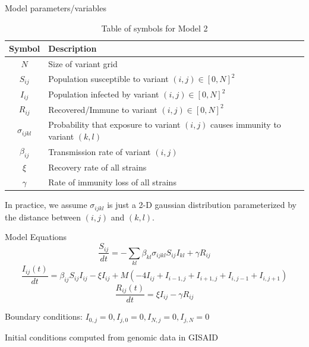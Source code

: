 \documentclass{beamer}
\begin{document}
\begin{frame}{Model parameters/variables}
    \begin{table}[h!]
        \begin{center}
        \begin{tabular}{c|p{8cm}}
                Symbol & Description \\
                \hline
                \hline
                $N$ & Size of variant grid \\
                $S_{ij}$ & Population susceptible to variant $(i,j) \in [0,N]^2$ \\
                $I_{ij}$ & Population infected by variant $(i,j) \in [0,N]^2$\\
                $R_{ij}$ & Recovered/Immune to variant $(i,j) \in [0,N]^2$\\
                $\sigma_{ijkl}$ & Probability that exposure to variant $(i,j)$ causes immunity \newline to variant $(k,l)$\\
                $\beta_{ij}$ & Transmission rate of variant $(i,j)$\\
                $\xi$ & Recovery rate of all strains \\
                $\gamma$ & Rate of immunity loss of all strains \\
        \end{tabular}
        \caption{Table of symbols for Model 2}
    
        \label{variables_2}
        \end{center}
    \end{table}
\end{frame}
\begin{frame}{\sigma}
    
    In practice, we assume $\sigma_{ijkl}$ is just a 2-D gaussian distribution parameterized by the distance between $(i,j)$ and $(k,l)$.
    \begin{figure}
        
    \end{figure}
\end{frame}
\begin{frame}{Model Equations}
    \small
    \begin{equation}
        \frac{S_{ij}}{dt} = -\sum_{kl} \beta_{kl} \sigma_{ijkl} S_{ij} I_{kl} + \gamma R_{ij}  \label{Seqn}
    \end{equation}
    \begin{equation}
        \frac{ I_{ij}(t)}{dt} = \beta_{ij} S_{ij} I_{ij} - \xi I_{ij} + M \left(- 4I_{ij} + I_{i-1,j}  + I_{i+1,j} + I_{i,j-1} + I_{i,j+1} \right) \label{Ieqn}    
    \end{equation}
    \begin{equation}
        \frac{R_{ij}(t)}{dt} = \xi I_{ij} - \gamma R_{ij}  \label{Reqn}
    \end{equation}

    Boundary conditions: $I_{0,j} = 0, I_{j,0} = 0,  I_{N,j} = 0, I_{j,N} = 0$

    Initial conditions computed from genomic data in GISAID 
\end{frame}
\begin{frame}[allowframebreaks]



\end{frame}
\end{document}
